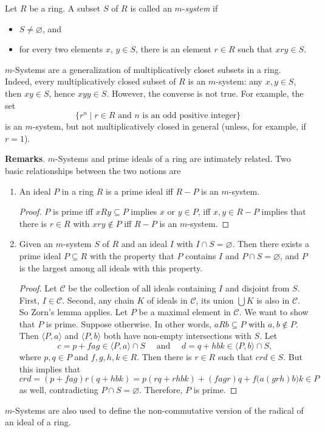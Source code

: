 \documentclass[12pt]{article}
\begin{document}

Let $R$ be a ring.  A subset $S$ of $R$ is called an $m$-{\em system} if 
\begin{itemize}
\item $S\ne \varnothing$, and
\item for every two elements $x,\,y\in S$, there is an element $r\in R$ such that $xry\in S$.
\end{itemize}

$m$-Systems are a generalization of multiplicatively closet subsets in a ring.  Indeed, every multiplicatively closed subset of $R$ is an $m$-system: any $x,y\in S$, then $xy\in S$, hence $xyy \in S$.  However, the converse is not true.  For example, the set $$\lbrace r^n\mid r\in R \mbox{ and } n \mbox{ is an odd positive integer}\rbrace$$ is an $m$-system, but not multiplicatively closed in general (unless, for example, if $r=1$).

\textbf{Remarks}.  $m$-Systems and prime ideals of a ring are intimately related.  Two basic relationships between the two notions are
\begin{enumerate}
\item An ideal $P$ in a ring $R$ is a prime ideal iff $R-P$ is an $m$-system.
\begin{proof}  $P$ is prime iff $xRy\subseteq P$ implies $x$ or $y\in P$, iff $x,y\in R-P$ implies that there is $r\in R$ with $xry\notin P$ iff $R-P$ is an $m$-system.
\end{proof}
\item Given an $m$-system $S$ of $R$ and an ideal $I$ with $I\cap S=\varnothing$.  Then there exists a prime ideal $P\subseteq R$ with the property that $P$ contains $I$ and $P\cap S = \varnothing$, and $P$ is the largest among all ideals with this property. 
\begin{proof}  Let $\mathcal{C}$ be the collection of all ideals containing $I$ and disjoint from $S$.  First, $I\in \mathcal{C}$.  Second, any chain $K$ of ideals in $\mathcal{C}$, its union $\bigcup K$ is also in $\mathcal{C}$.  So Zorn's lemma applies.  Let $P$ be a maximal element in $\mathcal{C}$.  We want to show that $P$ is prime.  Suppose otherwise.  In other words, $aRb\subseteq P$ with $a,b\notin P$.  Then $\langle P,a\rangle$ and $\langle P,b\rangle$ both have non-empty intersections with $S$. Let $$c=p+fag \in \langle P,a\rangle \cap S\quad \mbox{ and }\quad d=q+hbk \in \langle P,b\rangle \cap S,$$ where $p,q\in P$ and $f,g,h,k\in R$. Then there is $r\in R$ such that $crd\in S$. But this implies that $$crd = (p+fag)r(q+hbk)= p(rq+rhbk)+(fagr)q+f\big(a(grh)b\big)k \in P$$ as well, contradicting $P\cap S=\varnothing$.  Therefore, $P$ is prime.
\end{proof}
\end{enumerate}
$m$-Systems are also used to define the non-commutative version of the radical of an ideal of a ring.
\end{document}
